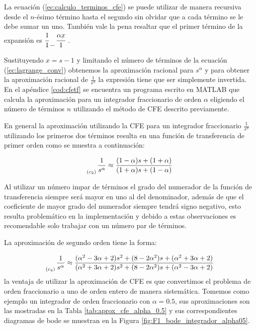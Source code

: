 	La ecuación (\ref{ec:calculo_terminos_cfe}) se puede utilizar de manera recursiva desde el $n$-ésimo término hasta el segundo sin olvidar que a cada término se le debe sumar un uno. También vale la pena resaltar que el primer término de la expansión es $\cfrac{1}{1} \genfrac{}{}{0pt}{0}{}{-} \cfrac{\alpha x}{1}$ . 

	Sustituyendo $x = s - 1$ y limitando el número de términos de la ecuación (\ref{ec:lagrange_conv}) obtenemos la aproximación racional para $s^{\alpha}$ y para obtener la aproximación racional de $\frac{1}{s^{\alpha}}$ la expresión tiene que ser simplemente invertida. En el apéndice \ref{cod:cfetf} se encuentra un programa escrito en MATLAB que calcula la aproximación para un integrador fraccionario de orden $\alpha$ eligiendo el número de términos $n$ utilizando el método de CFE descrito previamente.

	En general la aproximación utilizando la CFE para un integrador fraccionario $\frac{1}{s^{\alpha}}$ utilizando los primeros dos términos resulta en una función de transferencia de primer orden como se muestra a continuación:

	\begin{equation}
		\genfrac{}{}{0pt}{0}{}{_{(c_{2})}} \frac{1}{s^{\alpha}} \approx \frac{(1 - \alpha)s + (1 + \alpha) }{(1 + \alpha)s + (1 - \alpha)} 
	\end{equation}

	Al utilizar un número impar de términos el grado del numerador de la función de transferencia siempre será mayor en uno al del denominador, además de que el coeficiente de mayor grado del numerador siempre tendrá signo negativo, esto resulta problemático en la implementación y debido a estas observaciones es recomendable solo trabajar con un número par de términos.

	La aproximación de segundo orden tiene la forma:

	\begin{equation}
		\genfrac{}{}{0pt}{0}{}{_{(c_{4})}} \frac{1}{s^{\alpha}} \approx \frac{(\alpha^{2} - 3\alpha + 2) s^{2} + (8 - 2 \alpha^{2})s + (\alpha^{2} + 3\alpha + 2) }{(\alpha^{2} + 3\alpha + 2) s^{2} + (8 - 2 \alpha^{2})s + (\alpha^{2} - 3\alpha + 2)}
	\end{equation}
	la ventaja de utilizar la aproximación de CFE es que convertimos el problema de orden fraccionario a uno de orden entero de manera sistemática. Tomemos como ejemplo un integrador de orden fraccionario con $\alpha = 0.5$, sus aproximaciones son las mostradas en la Tabla \ref{tab:aprox_cfe_alpha_0.5} y sus correspondientes diagramas de bode se muestran en la Figura \ref{fig:F1_bode_integrador_alpha05}.


